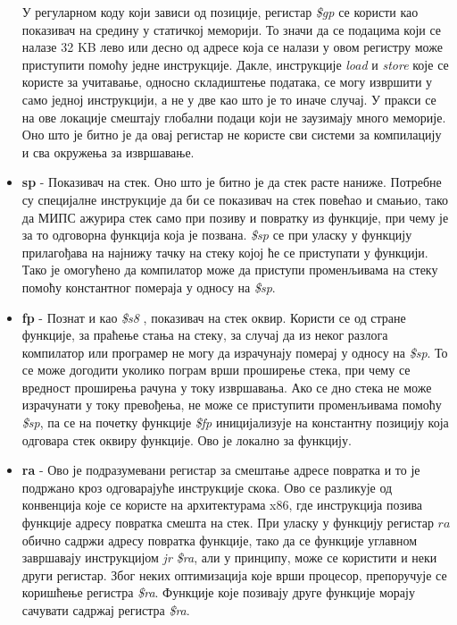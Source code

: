 \documentclass[12pt,oneside]{memoir}
\begin{document}
\begin{itemize}
У регуларном коду који зависи од позиције, регистар \textit{\$gp} се користи као показивач на средину у статичкој меморији. То значи да се подацима који се налазе 32 KB лево или десно од адресе која се налази у овом регистру може приступити помоћу једне инструкције. Дакле, инструкције \textit{load} и \textit{store} које се користе за учитавање, односно складиштење података, се могу извршити у само једној инструкцији, а не у две као што је то иначе случај. У пракси се на ове локације смештају глобални подаци који не заузимају много меморије. Оно што је битно је да овај регистар не користе сви системи за компилацију и сва окружења за извршавање.

\item \textbf{sp} - Показивач на стек. Оно што је битно је да стек расте наниже. Потребне су специјалне инструкције да би се показивач на стек повећао и смањио, тако да МИПС ажурира стек само при позиву и повратку из функције, при чему је за то одговорна функција која је позвана. \textit{\$sp} се при уласку у функцију прилагођава на најнижу тачку на стеку којој ће се приступати у функцији. Тако је омогућено да компилатор може да приступи променљивама на стеку помоћу константног помераја у односу на \textit{\$sp}.

\item \textbf{fp} - Познат и као \textit{\$s8} , показивач на стек оквир. Користи се од стране функције, за праћење стања на стеку, за случај да из неког разлога компилатор или програмер не могу да израчунају померај у односу на \textit{\$sp}. То се може догодити уколико пограм врши проширење стека, при чему се вредност проширења рачуна у току извршавања. Ако се дно стека не може израчунати у току превођења, не може се приступити променљивама помоћу \textit{\$sp}, па се на почетку функције \textit{\$fp} иницијализује на константну позицију која одговара стек оквиру функције. Ово је локално за функцију.

\item \textbf{ra} - Ово је подразумевани регистар за смештање адресе повратка и то је подржано кроз одговарајуће инструкције скока. Ово се разликује од конвенција које се користе на архитектурама x86, где инструкција позива функције адресу повратка смешта на стек. При уласку у функцију регистар $ra$ обично садржи адресу повратка функције, тако да се функције углавном завршавају инструкцијом \textit{jr \$ra}, али у принципу, може се користити и неки други регистар. Због неких оптимизација које врши процесор, препоручује се коришћење регистра \textit{\$ra}. Функције које позивају друге функције морају сачувати садржај регистра \textit{\$ra}.

\end{itemize}
\end{document}
